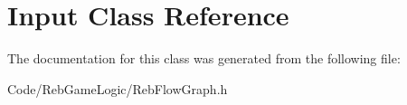 \hypertarget{class_input}{}\section{Input Class Reference}
\label{class_input}


The documentation for this class was generated from the following file\+:\begin{DoxyCompactItemize}
\item 
Code/\+Reb\+Game\+Logic/Reb\+Flow\+Graph.\+h\end{DoxyCompactItemize}
